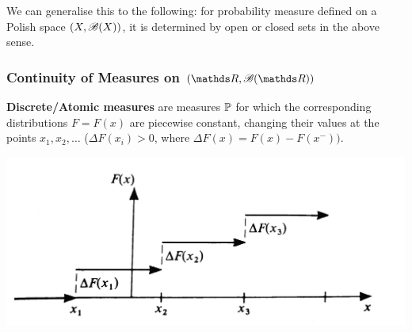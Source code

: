 \begin{unexaminable}
\begin{example}
We can generalise this to the following: for probability measure defined on a Polish space $(X,\mathcal{B}(X))$, it is determined by open or closed sets in the above sense.
\end{example}
\end{unexaminable}

\subsubsection{Continuity of Measures on $(\R, \B(\R))$}

\textbf{Discrete/Atomic measures} are measures $\mathbb{P}$ for which the corresponding distributions $F = F(x)$ are piecewise constant, changing their values at the points $x_1, x_2, \dots$ ($\Delta F(x_i) >0$, where $\Delta F(x) = F(x) - F(x^-))$. 
\begin{center}
    \includegraphics[scale = 0.2]{1.jpg}
\end{center}


